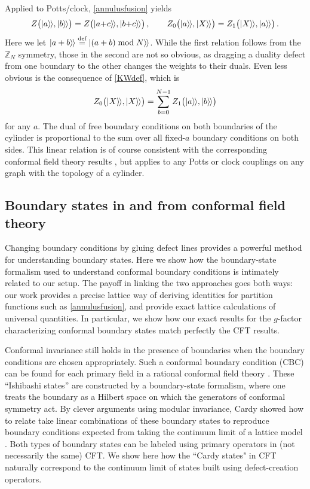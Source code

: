 Applied to Potts/clock, \eqref{annulusfusion} yields
\begin{align}
	Z\big( {|{a}\rangle\mkern-2mu\rangle},{|{b}\rangle\mkern-2mu\rangle} \big) = Z\big( {|{a{+}c}\rangle\mkern-2mu\rangle} , {|{b{+}c}\rangle\mkern-2mu\rangle} \big) \,,\qquad
	Z_0\big( {|{a}\rangle\mkern-2mu\rangle} , {|{X}\rangle\mkern-2mu\rangle} \big) = Z_1\big( {|{X}\rangle\mkern-2mu\rangle},{|{a}\rangle\mkern-2mu\rangle} \big) \,.
\end{align}
Here we let ${|{a+b}\rangle\mkern-2mu\rangle} \mathrel{\overset{\textrm{def}}{=}} {|{ (a+b)\bmod N }\rangle\mkern-2mu\rangle}$.
While the first relation follows from the $\mathbb{Z}_N$ symmetry, those in the second are not so obvious, as dragging a duality defect from one boundary to the other changes the weights to their duals.
Even less obvious is the consequence of \eqref{KWdef}, which is
\begin{align}
	Z_0\big( {|{X}\rangle\mkern-2mu\rangle},{|{X}\rangle\mkern-2mu\rangle} \big) = \sum_{b=0}^{N-1} Z_1\big( {|{a}\rangle\mkern-2mu\rangle},{|{b}\rangle\mkern-2mu\rangle} \big)
	\label{Zff}
\end{align}
for any $a$. The dual of free boundary conditions on both boundaries of the cylinder is proportional to the sum over all fixed-$a$ boundary conditions on both sides. 
This linear relation is of course consistent with the corresponding conformal field theory results \cite{Cardy1986b}, but  applies to any Potts or clock couplings on any graph with the topology of a cylinder.

\subsection{Boundary states in and from conformal field theory}
\label{sec:conformal}

Changing boundary conditions by gluing defect lines provides a powerful method for understanding boundary states.  Here we show how the boundary-state formalism used to understand conformal boundary conditions \cite{Cardy1989} is intimately related to our setup. The payoff in linking the two approaches goes both ways: our work provides a precise lattice way of deriving identities for partition functions such as \eqref{annulusfusion}, and provide exact lattice calculations of universal quantities. In particular, we show how our exact results for the $g$-factor characterizing conformal boundary states match perfectly the CFT results.

Conformal invariance still holds in the presence of boundaries when the boundary conditions are chosen appropriately. Such a conformal boundary condition (CBC) can be found for each primary field in a rational conformal field theory  \cite{Ishibashi1988}. These ``Ishibashi states'' are constructed by a boundary-state formalism, where one treats the boundary as a Hilbert space on which the generators of conformal symmetry act. By clever arguments using modular invariance, Cardy showed how to relate take linear combinations of these boundary states to reproduce boundary conditions expected from taking the continuum limit of a lattice model \cite{Cardy1989}.  Both types of boundary states can be labeled using primary operators in (not necessarily the same) CFT.  We show here how the ``Cardy states" in CFT naturally correspond to the continuum limit of states built using defect-creation operators.

